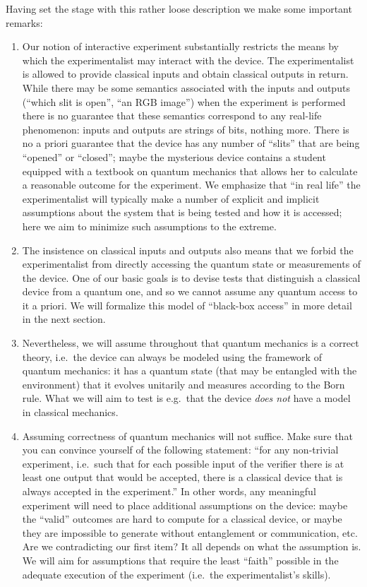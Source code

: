 Having set the stage with this rather loose description we make some important remarks: 
\begin{enumerate}
\item Our notion of interactive experiment substantially restricts the means by which the experimentalist may interact with the device. The experimentalist is allowed to provide classical inputs and obtain classical outputs in return. While there may be some semantics associated with the inputs and outputs (``which slit is open'', ``an RGB image'') when the experiment is performed there is no guarantee that these semantics correspond to any real-life phenomenon: inputs and outputs are strings of bits, nothing more. There is no a priori guarantee that the device has any number of ``slits'' that are being ``opened'' or ``closed''; maybe the mysterious device contains a student equipped with a textbook on quantum mechanics that allows her to calculate a reasonable outcome for the experiment. We emphasize that ``in real life'' the experimentalist will typically make a number of explicit and implicit assumptions about the system that is being tested and how it is accessed; here we aim to minimize such assumptions to the extreme.
\item The insistence on classical inputs and outputs also means that we forbid the experimentalist from directly accessing the quantum state or measurements of the device. One of our basic goals is to devise tests that distinguish a classical device from a quantum one, and so we cannot assume any quantum access to it a priori. We will formalize this model of ``black-box access'' in more detail in the next section.
\item Nevertheless, we will assume throughout that quantum mechanics is a correct theory, i.e.\ the device can always be modeled using the framework of quantum mechanics: it has a quantum state (that may be entangled with the environment) that it evolves unitarily and measures according to the Born rule. What we will aim to test is e.g.\ that the device \emph{does not} have a model in classical mechanics.
\item Assuming correctness of quantum mechanics will not suffice. Make sure that you can convince yourself of the following statement: ``for any non-trivial experiment, i.e.\ such that for each possible input of the verifier there is at least one output that would be accepted, there is a classical device that is always accepted in the experiment.'' In other words, any meaningful experiment will need to place additional assumptions on the device: maybe the ``valid'' outcomes are hard to compute for a classical device, or maybe they are impossible to generate without entanglement or communication, etc. Are we contradicting our first item? It all depends on what the assumption is. We will aim for assumptions that require the least ``faith'' possible in the adequate execution of the experiment (i.e.\ the experimentalist's skills).

\end{enumerate}
